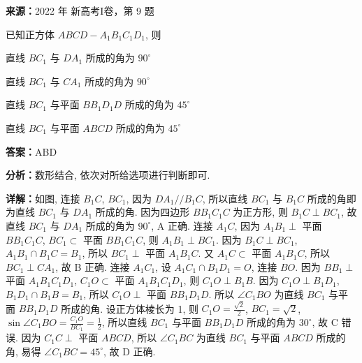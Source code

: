 \begin{question}[points=5]
\textbf{来源：}2022 年 新高考I卷，第 9 题\par
已知正方体 $ABCD - A_1B_1C_1D_1$, 则
\begin{choices}
  \item 直线 $BC_1$ 与 $DA_1$ 所成的角为 $90^\circ$
  \item 直线 $BC_1$ 与 $CA_1$ 所成的角为 $90^\circ$
  \item 直线 $BC_1$ 与平面 $BB_1D_1D$ 所成的角为 $45^\circ$
  \item 直线 $BC_1$ 与平面 $ABCD$ 所成的角为 $45^\circ$
\end{choices}
\begin{solution}
\textbf{答案：}ABD

\textbf{分析：}数形结合, 依次对所给选项进行判断即可.

\textbf{详解：}如图, 连接 $B_1C$, $BC_1$, 因为 $DA_1 /\!\! / B_1C$, 所以直线 $BC_1$ 与 $B_1C$ 所成的角即为直线 $BC_1$ 与 $DA_1$ 所成的角. 因为四边形 $BB_1C_1C$ 为正方形, 则 $B_1C \perp BC_1$, 故直线 $BC_1$ 与 $DA_1$ 所成的角为 $90^\circ$, A 正确. 连接 $A_1C$, 因为 $A_1B_1 \perp$ 平面 $BB_1C_1C$, $BC_1 \subset$ 平面 $BB_1C_1C$, 则 $A_1B_1 \perp BC_1$. 因为 $B_1C \perp BC_1$, $A_1B_1 \cap B_1C = B_1$, 所以 $BC_1 \perp$ 平面 $A_1B_1C$. 又 $A_1C \subset$ 平面 $A_1B_1C$, 所以 $BC_1 \perp CA_1$, 故 B 正确. 连接 $A_1C_1$, 设 $A_1C_1 \cap B_1D_1 = O$, 连接 $BO$. 因为 $BB_1 \perp$ 平面 $A_1B_1C_1D_1$, $C_1O \subset$ 平面 $A_1B_1C_1D_1$, 则 $C_1O \perp B_1B$. 因为 $C_1O \perp B_1D_1$, $B_1D_1 \cap B_1B = B_1$, 所以 $C_1O \perp$ 平面 $BB_1D_1D$. 所以 $\angle C_1BO$ 为直线 $BC_1$ 与平面 $BB_1D_1D$ 所成的角. 设正方体棱长为 1, 则 $C_1O = \frac{\sqrt{2}}{2}$, $BC_1 = \sqrt{2}$, $\sin\angle C_1BO = \frac{C_1O}{BC_1} = \frac{1}{2}$, 所以直线 $BC_1$ 与平面 $BB_1D_1D$ 所成的角为 $30^\circ$, 故 C 错误. 因为 $C_1C \perp$ 平面 $ABCD$, 所以 $\angle C_1BC$ 为直线 $BC_1$ 与平面 $ABCD$ 所成的角, 易得 $\angle C_1BC = 45^\circ$, 故 D 正确.
\end{solution}
\end{question}

